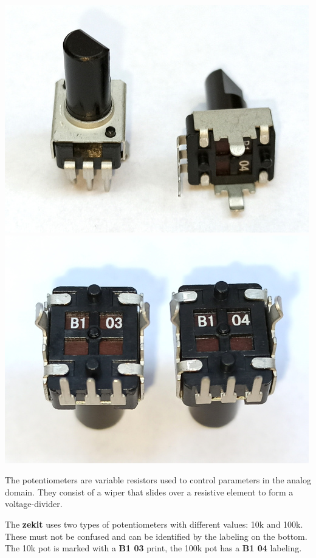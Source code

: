 \documentclass{scrartcl}
\begin{document}
\begin{center}
    \includegraphics[scale=0.5]{assets/zekit-pots1-resized.jpg}
    \includegraphics[scale=0.5]{assets/zekit-pots2-resized.jpg}
\end{center}

The potentiometers are variable resistors used to control parameters in the analog domain. They consist of a wiper that slides over a resistive element to form a voltage-divider.

The \textbf{zekit} uses two types of potentiometers with different values: 10k and 100k. These must not be confused and can be identified by the labeling on the bottom. The 10k pot is marked with a \textbf{B1 03} print, the 100k pot has a \textbf{B1 04} labeling.
\end{document}
